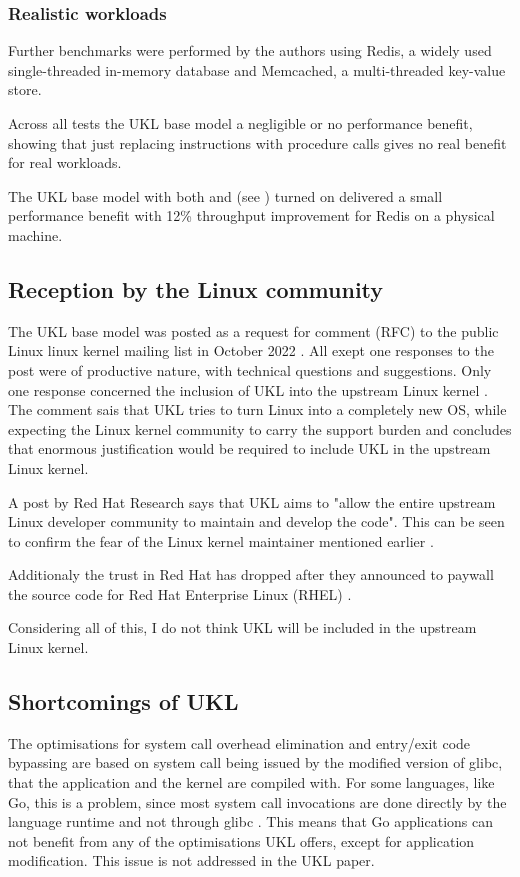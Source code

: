 \documentclass[10pt,twocolumn,a4paper]{article}
\begin{document}
    \subsubsection{Realistic workloads}
      Further benchmarks were performed by the authors using Redis, a widely used single-threaded 
      in-memory database and Memcached, a multi-threaded key-value store.

      Across all tests the UKL base model a negligible or no performance benefit,
      showing that just replacing  instructions with procedure calls
      gives no real benefit for real workloads.

      The UKL base model with both  and 
      (see ) turned on delivered a small performance
      benefit with 12\% throughput improvement for Redis on a physical machine.

  \subsection{Reception by the Linux community}
    The UKL base model was posted as a request for comment (RFC) to the public Linux linux
    kernel mailing list in October 2022 \cite{ukl-rfc-lwn}.
    All exept one responses to the post were of productive nature, with technical questions
    and suggestions. 
    Only one response concerned the inclusion of UKL into the upstream Linux kernel 
    \cite{ukl-rfc-negative}.
    The comment sais that UKL tries to turn Linux into a completely new OS, while expecting 
    the Linux kernel community to carry the support burden and concludes that enormous
    justification would be required to include UKL in the upstream Linux kernel.

    A post by Red Hat Research \cite{ukl-redhat-post} says that UKL aims to "allow 
    the entire upstream Linux developer community to maintain and develop the code".
    This can be seen to confirm the fear of the Linux kernel maintainer mentioned earlier
    \cite{ukl-rfc-negative}.

    Additionaly the trust in Red Hat has dropped after they announced to paywall the
    source code for Red Hat Enterprise Linux (RHEL) \cite{redhat-fuckup}.

    Considering all of this, I do not think UKL will be included in the upstream
    Linux kernel.

  \subsection{Shortcomings of UKL}
    The optimisations for system call overhead elimination and entry/exit code bypassing
    are based on system call being issued by the modified version of glibc, that
    the application and the kernel are compiled with.
    For some languages, like Go, this is a problem, since most system call invocations
    are done directly by the language runtime and not through glibc \cite{ukl-vs-unicraft}.
    This means that Go applications can not benefit from any of the optimisations UKL offers,
    except for application modification.
    This issue is not addressed in the UKL paper.



\end{document}
